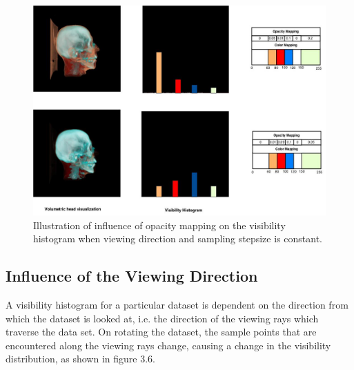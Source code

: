 \begin{figure}
\centering
\includegraphics[width=450pt]{Images/tf_influence.jpg}
\caption{ Illustration of influence of opacity mapping on the visibility histogram when viewing direction and sampling stepsize is constant. }
\end{figure}

\subsection{Influence of the Viewing Direction}

A visibility histogram for a particular dataset is dependent on the direction from which the dataset is looked at, i.e. the direction of the viewing rays which traverse the data set. On rotating the dataset, the sample points that are encountered along the viewing rays change, causing a change in the visibility distribution, as shown in figure 3.6. \\

